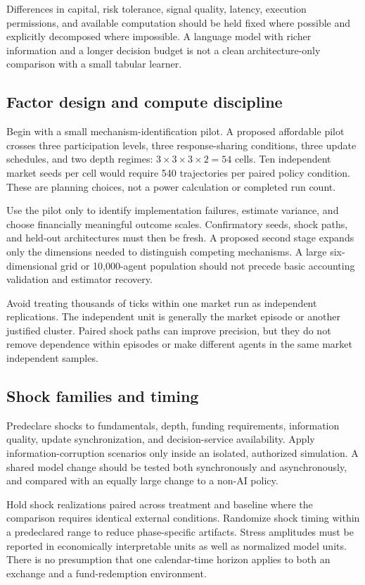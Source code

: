 \documentclass[11pt,a4paper]{article}
\theoremstyle{definition}
\theoremstyle{remark}
\begin{document}
Differences in capital, risk tolerance, signal quality, latency, execution permissions, and available computation should be held fixed where possible and explicitly decomposed where impossible. A language model with richer information and a longer decision budget is not a clean architecture-only comparison with a small tabular learner.

\subsection{Factor design and compute discipline}
Begin with a small mechanism-identification pilot. A proposed affordable pilot crosses three participation levels, three response-sharing conditions, three update schedules, and two depth regimes: $3\times3\times3\times2=54$ cells. Ten independent market seeds per cell would require 540 trajectories per paired policy condition. These are planning choices, not a power calculation or completed run count.

Use the pilot only to identify implementation failures, estimate variance, and choose financially meaningful outcome scales. Confirmatory seeds, shock paths, and held-out architectures must then be fresh. A proposed second stage expands only the dimensions needed to distinguish competing mechanisms. A large six-dimensional grid or 10,000-agent population should not precede basic accounting validation and estimator recovery.

Avoid treating thousands of ticks within one market run as independent replications. The independent unit is generally the market episode or another justified cluster. Paired shock paths can improve precision, but they do not remove dependence within episodes or make different agents in the same market independent samples.

\subsection{Shock families and timing}
Predeclare shocks to fundamentals, depth, funding requirements, information quality, update synchronization, and decision-service availability. Apply information-corruption scenarios only inside an isolated, authorized simulation. A shared model change should be tested both synchronously and asynchronously, and compared with an equally large change to a non-AI policy.

Hold shock realizations paired across treatment and baseline where the comparison requires identical external conditions. Randomize shock timing within a predeclared range to reduce phase-specific artifacts. Stress amplitudes must be reported in economically interpretable units as well as normalized model units. There is no presumption that one calendar-time horizon applies to both an exchange and a fund-redemption environment.
\end{document}
